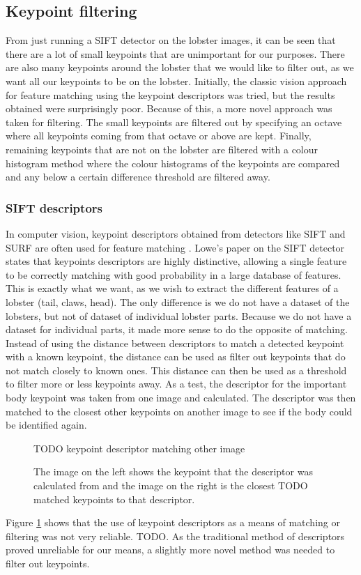 \subsection{Keypoint filtering}\label{sec:kp-filter}
From just running a SIFT detector on the lobster images, it can be seen that there are a lot of small keypoints that are unimportant for our purposes. There are also many keypoints around the lobster that we would like to filter out, as we want all our keypoints to be on the lobster. Initially, the classic vision approach for feature matching using the keypoint descriptors \cite{sift} was tried, but the results obtained were surprisingly poor. Because of this, a more novel approach was taken for filtering. The small keypoints are filtered out by specifying an octave where all keypoints coming from that octave or above are kept. Finally, remaining keypoints that are not on the lobster are filtered with a colour histogram method where the colour histograms of the keypoints are compared and any below a certain difference threshold are filtered away.

\subsubsection{SIFT descriptors}
In computer vision, keypoint descriptors obtained from detectors like SIFT and SURF are often used for feature matching \cite{cv-matching}. Lowe's paper \cite{sift} on the SIFT detector states that keypoints descriptors are highly distinctive, allowing a single feature to be correctly matching with good probability in a large database of features. This is exactly what we want, as we wish to extract the different features of a lobster (tail, claws, head). The only difference is we do not have a dataset of the lobsters, but not of dataset of individual lobster parts. 
\n
Because we do not have a dataset for individual parts, it made more sense to do the opposite of matching. Instead of using the distance between descriptors to match a detected keypoint with a known keypoint, the distance can be used as filter out keypoints that do not match closely to known ones. This distance can then be used as a threshold to filter more or less keypoints away. 
\n
As a test, the descriptor for the important body keypoint was taken from one image and calculated. The descriptor was then matched to the closest other keypoints on another image to see if the body could be identified again. 

\begin{figure}[H]
\centering
TODO keypoint descriptor matching other image
\caption{The image on the left shows the keypoint that the descriptor was calculated from and the image on the right is the closest TODO matched keypoints to that descriptor.}
\label{fig:kp-descriptor}
\end{figure}
\noindent
Figure \ref{fig:kp-descriptor} shows that the use of keypoint descriptors as a means of matching or filtering was not very reliable. TODO. As the traditional method of descriptors proved unreliable for our means, a slightly more novel method was needed to filter out keypoints.

